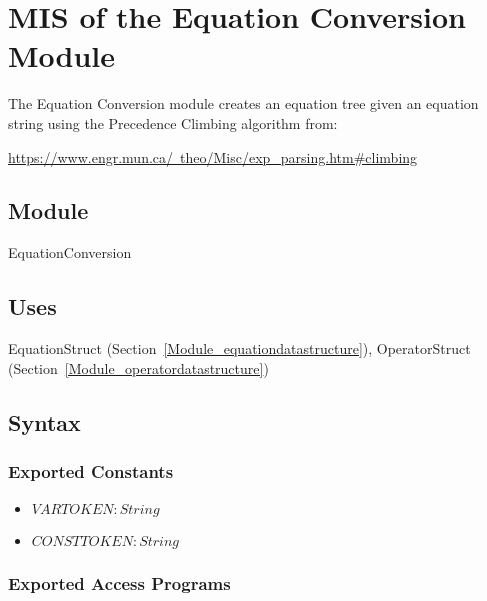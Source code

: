 \documentclass[12pt, titlepage]{article}
\begin{document}
\newpage

\section{MIS of the Equation Conversion Module} 
\label{Module_equationconversion}
The Equation Conversion module creates an equation tree given an equation 
string using the Precedence Climbing algorithm from:
\begin{center}
	\href{https://www.engr.mun.ca/~theo/Misc/exp\_parsing.htm\#climbing}{https://www.engr.mun.ca/~theo/Misc/exp\_parsing.htm\#climbing}
\end{center}

\subsection{Module}

EquationConversion

\subsection{Uses}

EquationStruct (Section~\ref{Module_equationdatastructure}), OperatorStruct (Section~\ref{Module_operatordatastructure})

\subsection{Syntax}

\subsubsection{Exported Constants}

\begin{itemize}
	\item $VARTOKEN : String$
	\item $CONSTTOKEN : String$
\end{itemize}

\subsubsection{Exported Access Programs}
\end{document}
